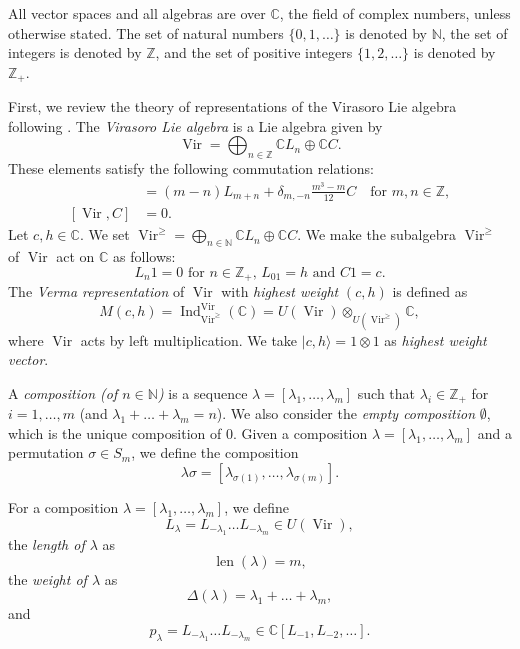 \documentclass[a4paper, 12pt, reqno]{amsart}
\theoremstyle{remark}
\DeclareMathOperator{\Vir}{Vir}
\DeclareMathOperator{\Ind}{Ind}
\DeclareMathOperator{\len}{len}
\begin{document}
All vector spaces and all algebras are over $\mathbb{C}$, the field of complex numbers, unless otherwise stated.
The set of natural numbers $\{0, 1, \dots\}$ is denoted by $\mathbb{N}$, the set of integers is denoted by $\mathbb{Z}$, and the set of positive integers $\{1, 2, \dots\}$ is denoted by $\mathbb{Z}_+$.

First, we review the theory of representations of the Virasoro Lie algebra following \cite{kac_bombay_2013}.
The \emph{Virasoro Lie algebra} is a Lie algebra given by
\begin{equation*}
  \Vir = \bigoplus_{n \in \mathbb{Z}}\mathbb{C}L_n \oplus \mathbb{C}C.
\end{equation*}
These elements satisfy the following commutation relations:
\begin{align*}
  [L_m, L_n] &= (m - n)L_{m + n} + \delta_{m, -n}\frac{m^3 - m}{12}C \quad \text{for $m, n \in \mathbb{Z}$}, \\
  [\Vir, C] &= 0.
\end{align*}
Let $c, h \in \mathbb{C}$.
We set $\Vir^{\ge} = \bigoplus_{n \in \mathbb{N}}\mathbb{C}L_n \oplus \mathbb{C}C$.
We make the subalgebra $\Vir^{\ge}$ of $\Vir$ act on $\mathbb{C}$ as follows:
\begin{equation*}
  \text{$L_n1 = 0$ for $n \in \mathbb{Z}_+$, $L_01 = h$ and $C1 = c$}.
\end{equation*}
The \emph{Verma representation} of $\Vir$ with \emph{highest weight} $(c, h)$ is defined as
\begin{equation*}
  M(c, h) = \Ind^{\Vir}_{\Vir^{\ge}}(\mathbb{C}) = U(\Vir) \otimes_{U(\Vir^{\ge})} \mathbb{C},
\end{equation*}
where $\Vir$ acts by left multiplication.
We take $|c, h\rangle = 1\otimes1$ as \emph{highest weight vector}.

A \emph{composition (of $n \in \mathbb{N}$)} is a sequence $\lambda = [\lambda_1, \dots, \lambda_m]$ such that $\lambda_i \in \mathbb{Z}_+$ for $i = 1, \dots, m$ (and $\lambda_1 + \dots + \lambda_m = n$).
We also consider the \emph{empty composition} $\emptyset$, which is the unique composition of $0$.
Given a composition $\lambda = [\lambda_1, \dots, \lambda_m]$ and a permutation $\sigma \in S_m$, we define the composition
\begin{equation*}
  \lambda\sigma = [\lambda_{\sigma(1)}, \dots, \lambda_{\sigma(m)}].
\end{equation*}

For a composition $\lambda = [\lambda_1, \dots, \lambda_m]$, we define
\begin{equation*}
  L_{\lambda} = L_{-\lambda_1}\dots L_{-\lambda_m} \in U(\Vir),
\end{equation*}
the \emph{length of $\lambda$} as
\begin{equation*}
  \len(\lambda) = m,
\end{equation*}
the \emph{weight of $\lambda$} as
\begin{equation*}
  \Delta(\lambda) = \lambda_1 + \dots + \lambda_m,
\end{equation*}
and
\begin{equation*}
  p_{\lambda} = L_{-\lambda_1}\dots L_{-\lambda_m} \in \mathbb{C}[L_{-1}, L_{-2}, \dots].
\end{equation*}
\end{document}
